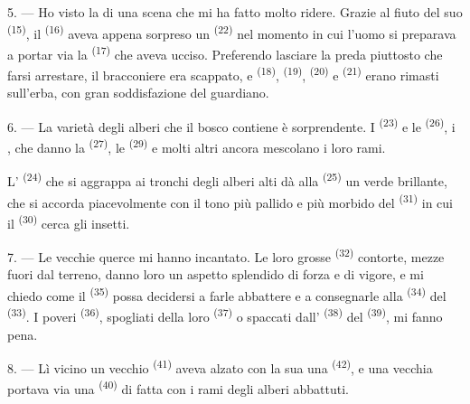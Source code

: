 \VUsaut{3.0mm}
\VUsaut{3.0mm}

5. --- Ho visto la  di una scena che mi ha fatto molto ridere. Grazie al
fiuto del suo  \textsuperscript{(15)}, il 
\textsuperscript{(16)} aveva appena sorpreso un 
\textsuperscript{(22)} nel momento in cui l'uomo si preparava a portar via la
 \textsuperscript{(17)} che aveva ucciso. Preferendo lasciare la
preda piuttosto che farsi arrestare, il bracconiere era scappato, e 
\textsuperscript{(18)},  \textsuperscript{(19)},
 \textsuperscript{(20)} e 
\textsuperscript{(21)} erano rimasti sull'erba, con gran soddisfazione del guardiano.

6. --- La varietà degli alberi che il bosco contiene è sorprendente. I 
\textsuperscript{(23)} e le  \textsuperscript{(26)}, i ,
che danno la  \textsuperscript{(27)}, le 
\textsuperscript{(29)} e molti altri ancora mescolano i loro rami.

L' \textsuperscript{(24)} che si aggrappa ai tronchi degli alberi alti dà
alla  \textsuperscript{(25)} un verde brillante, che si accorda
piacevolmente con il tono più pallido e più morbido del 
\textsuperscript{(31)} in cui il  \textsuperscript{(30)} cerca
gli insetti.

\VUsaut{3.0mm}
\VUsaut{3.0mm}

7. --- Le vecchie querce mi hanno incantato. Le loro grosse 
\textsuperscript{(32)} contorte, mezze fuori dal terreno, danno loro un aspetto
splendido di forza e di vigore, e mi chiedo come il 
\textsuperscript{(35)} possa decidersi a farle abbattere e a consegnarle alla
 \textsuperscript{(34)} del  \textsuperscript{(33)}. I
poveri  \textsuperscript{(36)}, spogliati della loro 
\textsuperscript{(37)} o spaccati dall' \textsuperscript{(38)} del
 \textsuperscript{(39)}, mi fanno pena.

8. --- Lì vicino un vecchio  \textsuperscript{(41)} aveva alzato con
la sua  una  \textsuperscript{(42)}, e una vecchia
portava via una  \textsuperscript{(40)} di  fatta
con i rami degli alberi abbattuti.

